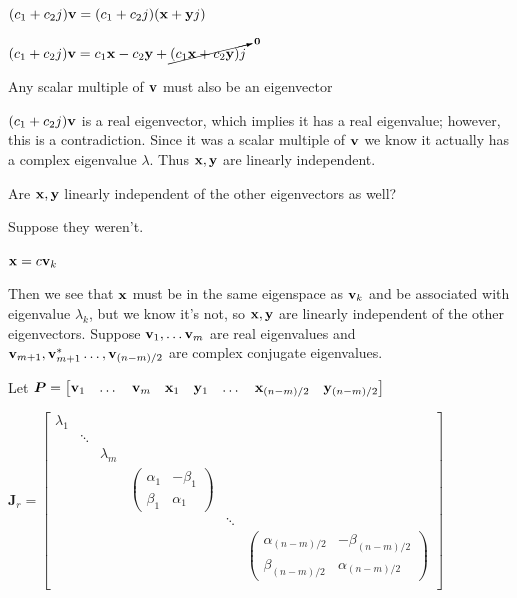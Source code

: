 \documentclass[11pt]{article}
\begin{document}
  \((c_1 + c_2j)\mathbf{v} = (c_1 + c_2j)(\mathbf{x} + \mathbf{y}j)\)

  \((c_1 + c_2j)\mathbf{v} = c_1\mathbf{x} - c_2\mathbf{y} + \cancelto{\mathbf{0}}{(c_1\mathbf{x} + c_2\mathbf{y})j}\)

  Any scalar multiple of \(\mathbf{v}\) must also be an eigenvector

  \((c_1 + c_2j)\mathbf{v}\) is a real eigenvector, which implies it has a real eigenvalue; however, this
  is a contradiction. Since it was a scalar multiple of \(\mathbf{v}\) we know it actually
  has a complex eigenvalue \(\lambda\). Thus \(\mathbf{x}, \mathbf{y}\) are linearly independent.

  Are \(\mathbf{x}, \mathbf{y}\) linearly independent of the other eigenvectors as well?

  Suppose they weren't.

  \(\mathbf{x} = c\mathbf{v}_k\)

  Then we see that \(\mathbf{x}\) must be in the same eigenspace as \(\mathbf{v}_k\) and be associated with
  eigenvalue \(\lambda_k\), but we know it's not, so \(\mathbf{x},\mathbf{y}\) are linearly
  independent of the other eigenvectors. Suppose \(\mathbf{v}_1, \dots \mathbf{v}_m\) are real
  eigenvalues and \(\mathbf{v}_{m + 1}, \mathbf{v}^*_{m + 1}\dots, \mathbf{v}_{(n - m) / 2}\) are complex conjugate eigenvalues.

  Let \(\bm{P} =
  \begin{bmatrix}
    \mathbf{v}_1 & \dots & \mathbf{v}_{m} & \mathbf{x}_1 & \mathbf{y}_1 & \dots & \mathbf{x}_{(n - m) / 2} & \mathbf{y}_{(n - m) / 2}
  \end{bmatrix}\)

  \(\bm{J}_r =
  \begin{bmatrix}
    \lambda_1 & \\
    & \ddots \\
    & & \lambda_m \\
    & & & \begin{pmatrix} \alpha_1 & - \beta_1 \\ \beta_1 & \alpha_1 \end{pmatrix}\\
    & & & & \ddots \\
    & & & & &
    \begin{pmatrix} \alpha_{(n - m) / 2} & - \beta_{(n - m) / 2} \\ \beta_{(n - m) / 2} & \alpha_{(n - m) / 2} \end{pmatrix}\\
  \end{bmatrix}\)
\end{document}
